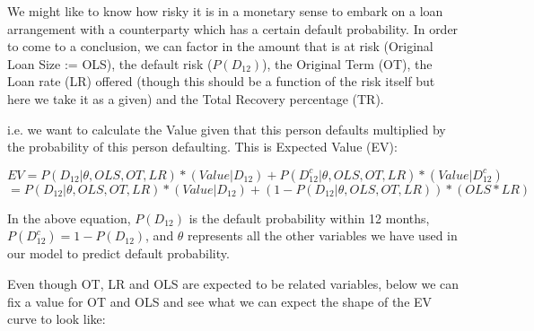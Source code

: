 \documentclass[11pt]{article}
\begin{document}
We might like to know how risky it is in a monetary sense to embark on a
loan arrangement with a counterparty which has a certain default
probability. In order to come to a conclusion, we can factor in the
amount that is at risk (Original Loan Size := OLS), the default risk
(\(P(D_{12})\)), the Original Term (OT), the Loan rate (LR) offered
(though this should be a function of the risk itself but here we take it
as a given) and the Total Recovery percentage (TR).

i.e. we want to calculate the Value given that this person defaults
multiplied by the probability of this person defaulting. This is
Expected Value (EV):

\[EV = P(D_{12}|\theta,OLS,OT,LR)*(Value | D_{12}) + P(D_{12}^c | \theta,OLS,OT,LR) * (Value | D_{12}^c)\]
\[ = P(D_{12}|\theta,OLS,OT,LR)*(Value | D_{12}) + (1 - P(D_{12} | \theta,OLS,OT,LR)) * (OLS*LR)\]

In the above equation, \(P(D_{12})\) is the default probability within
12 months, \(P(D_{12}^c)=1-P(D_{12})\), and \(\theta\) represents all
the other variables we have used in our model to predict default
probability.

Even though OT, LR and OLS are expected to be related variables, below
we can fix a value for OT and OLS and see what we can expect the shape
of the EV curve to look like:
\end{document}
